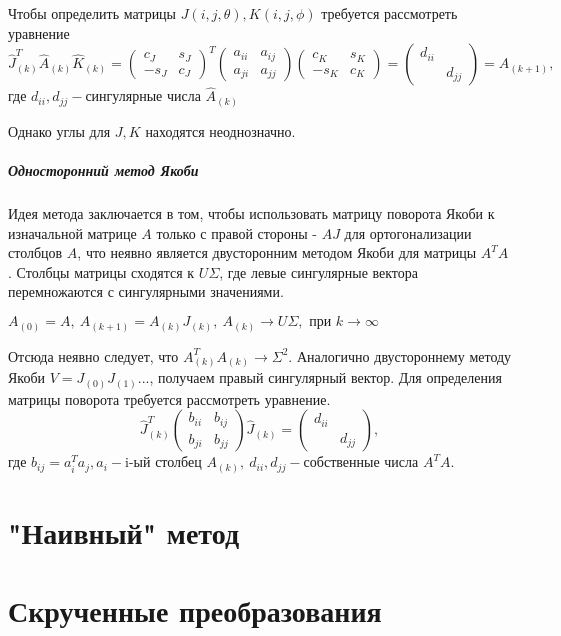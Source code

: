 \documentclass[12pt, a4paper]{report}
\theoremstyle{note}
\begin{document}
Чтобы определить матрицы $J(i,j,\theta), K(i,j,\phi)$ требуется рассмотреть уравнение
\begin{equation}
    \hat{J}_{(k)}^T\hat{A}_{(k)}\hat{K}_{(k)} = \begin{pmatrix}
        c_J&s_J\\
        -s_J&c_J
    \end{pmatrix}^T
    \begin{pmatrix}
        a_{ii}&a_{ij}\\
        a_{ji}&a_{jj}
    \end{pmatrix}
    \begin{pmatrix}
        c_K&s_K\\
        -s_K&c_K
    \end{pmatrix} = \begin{pmatrix}
        d_{ii} &\\
        &d_{jj}
    \end{pmatrix} = A_{(k+1)},
\end{equation}
где $d_{ii}, d_{jj} -\text{сингулярные числа } \hat{A}_{(k)}$

Однако углы для $J, K$ находятся неоднозначно.
\paragraph{Односторонний метод Якоби}

Идея метода заключается в том, чтобы использовать матрицу поворота Якоби к изначальной матрице $A$ только с правой стороны - $AJ$ для ортогонализации столбцов $A$, что неявно является двусторонним методом Якоби для матрицы $A^TA$.
Столбцы матрицы сходятся к $U\Sigma$, где левые сингулярные вектора перемножаются с сингулярными значениями.
\begin{center}
    $A_{(0)}=A,\ A_{(k+1)} = A_{(k)}J_{(k)},\ A_{(k)} \longrightarrow U\Sigma, \text{ при } k\to\infty$
\end{center}
Отсюда неявно следует, что $A^T_{(k)}A_{(k)} \to \Sigma^2$. Аналогично двустороннему методу Якоби $V = J_{(0)}J_{(1)}...$, получаем правый сингулярный вектор.
Для определения матрицы поворота требуется рассмотреть уравнение.
\begin{equation}
    \hat{J}^T_{(k)}\begin{pmatrix}
        b_{ii}&b_{ij}\\
        b_{ji}&b_{jj}
    \end{pmatrix}\hat{J}_{(k)} = \begin{pmatrix}
        d_{ii} &\\
        & d_{jj}
    \end{pmatrix},
\end{equation}
где $b_{ij} = a_i^Ta_j, a_i-\text{i-ый столбец }A_{(k)},\ d_{ii}, d_{jj} -\text{собственные числа } A^TA$.

\chapter{"Наивный" метод}

\chapter{Скрученные преобразования}
\end{document}
